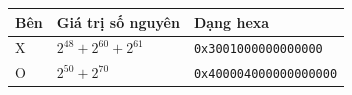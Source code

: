 \begin{tabular}{@{}lll@{}}
\toprule
\textbf{Bên} & \textbf{Giá trị số nguyên} & \textbf{Dạng hexa} \\
\midrule
X & $2^{48} + 2^{60} + 2^{61}$ & \texttt{0x3001000000000000} \\
O & $2^{50} + 2^{70}$ & \texttt{0x400004000000000000} \\
\bottomrule
\end{tabular}

